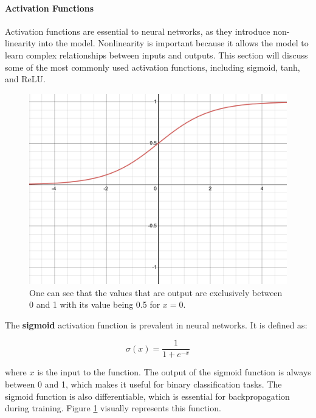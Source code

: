 \paragraph{Activation Functions} \label{sec:activation}

Activation functions are essential to neural networks, as they introduce non-linearity into the model. Nonlinearity is important because it allows the model to learn complex relationships between inputs and outputs. This section will discuss some of the most commonly used activation functions, including sigmoid, \ac{tanh}, and \ac{ReLU}.

\begin{figure}[ht]
    \centering
    \includegraphics[width=\textwidth/2]{figures/2-sota/activation/sigmoid.png}
    \caption[Sigmoid Activation Function]{One can see that the values that are output are exclusively between 0 and 1 with its value being 0.5 for $x = 0$.}
    \label{fig:sigmoid}
\end{figure}

\label{sec:sigmoid}

The \textbf{sigmoid} activation function is prevalent in neural networks. It is defined as:

\begin{equation}
	\sigma(x) = \frac{1}{1 + e^{-x}}
\end{equation}

where $x$ is the input to the function. The output of the sigmoid function is always between 0 and 1, which makes it useful for binary classification tasks. The sigmoid function is also differentiable, which is essential for backpropagation during training. Figure \ref{fig:sigmoid} visually represents this function.

